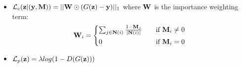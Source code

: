 \documentclass{article}
\begin{document}
\begin{itemize}
	\item $\mathcal{L}_c(\mathbf{\boldsymbol{z}}|(\mathbf{\boldsymbol{y}}, \mathbf{\boldsymbol{M}})) = ||\mathbf{\boldsymbol{W}} \odot (G(\mathbf{\boldsymbol{z}}) - \mathbf{\boldsymbol{y}})||_1$
	where $\mathbf{\boldsymbol{W}}$ is the importance weighting term:
	\[ \Wvec_i = 
	\begin{cases*}
	\sum_{j \in \Nvec(i)} \frac{1 - \Mvec_j}{|\Nvec(i)|} \quad& if $ \Mvec_i \neq 0 $ \\
	0 & if $ \Mvec_i = 0 $
	\end{cases*}\]

	\item $\mathcal{L}_p(\mathbf{\boldsymbol{z}}) = \lambda log(1 - D(G(\mathbf{\boldsymbol{z}})))$

\end{itemize}
\end{document}
